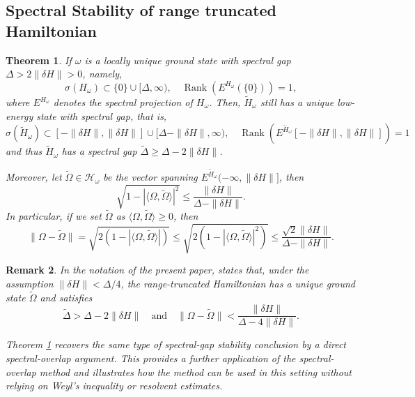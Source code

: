 \documentclass[11pt]{article}
\numberwithin{equation}{section}
\newtheorem{theorem}{Theorem}[section]
\newtheorem{remark}[theorem]{Remark}
\begin{document}
\subsection{Spectral Stability of range truncated Hamiltonian}
\begin{theorem}\label{thm_range}
If $\omega$ is a locally unique ground state with spectral gap $\Delta>2\|\delta H\|>0$, namely,
\[
\sigma(H_\omega)\subset \{0\}\cup [\Delta,\infty),\quad
\operatorname{Rank}(E^{H_\omega}(\{0\}))=1,
\]
where $E^{H_\omega}$ denotes the spectral projection of $H_\omega$. Then, $\tilde{H}_\omega$ still has a unique low-energy state with spectral gap, that is,
\[
\sigma(\tilde{H}_\omega)\subset [-\|\delta H\|,\|\delta H\|] \cup [\Delta-\|\delta H\|,\infty),\quad
\operatorname{Rank}(E^{\tilde{H}_\omega}[-\|\delta H\|,\|\delta H\|])=1
\]
and thus $\tilde{H}_\omega$ has a spectral gap $\tilde{\Delta}\geq\Delta-2\|\delta H\|$.

Moreover, let $\tilde{\Omega}\in\mathcal{H}_\omega$ be the vector spanning $E^{\tilde{H}_\omega}(-\infty,\|\delta H\|]$, then 
\[
\sqrt{1-|\langle\Omega,\tilde{\Omega}\rangle|^2}
\leq \frac{\|\delta H\|}{\Delta-\|\delta H\|}.
\]
In particular, if we set $\tilde{\Omega}$ as $\langle\Omega,\tilde{\Omega}\rangle\geq0$, then
\[
\|\Omega-\tilde{\Omega}\|
=\sqrt{2(1-|\langle\Omega,\tilde{\Omega}\rangle|)}
\leq \sqrt{2(1-|\langle\Omega,\tilde{\Omega}\rangle|^2)}
\leq \frac{\sqrt{2}\|\delta H\|}{\Delta-\|\delta H\|}.
\]
\end{theorem}

\begin{remark}
In the notation of the present paper, \cite[Lemma B.5]{Liu-Yi-Zhou-Zou2025} states that, under the assumption $\|\delta H\|<\Delta/4$, the range-truncated Hamiltonian has a unique ground state $\tilde{\Omega}$ and satisfies
\[
\tilde\Delta>\Delta-2\|\delta H\|
\quad\text{and}\quad
\|\Omega-\tilde{\Omega}\|
<\frac{\|\delta H\|}{\Delta-4\|\delta H\|}.
\]

Theorem \ref{thm_range} recovers the same type of spectral-gap stability conclusion by a direct spectral-overlap argument. This provides a further application of the spectral-overlap method and illustrates how the method can be used in this setting without relying on Weyl's inequality or resolvent estimates.
\end{remark}
\end{document}

